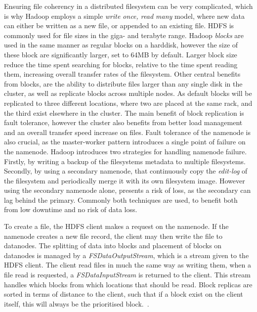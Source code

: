 Ensuring file coherency in a distributed filesystem can be very complicated, which is why Hadoop employs a simple \emph{write once, read many} model, where new data can either be written as a new file, or appended to an existing file. HDFS is commonly used for file sizes in the giga- and terabyte range. Hadoop \emph{blocks} are used in the same manner as regular blocks on a harddisk, however the size of these block are significantly larger, set to 64MB by default. Larger block size reduce the time spent searching for blocks, relative to the time spent reading them, increasing overall transfer rates of the filesystem. Other central benefits from blocks, are the ability to distribute files larger than any single disk in the cluster, as well as replicate blocks across multiple nodes. 
As default blocks will be replicated to three different locations, where two are placed at the same rack, and the third exist elsewhere in the cluster. The main benefit of block replication is fault tolerance, however the cluster also benefits from better load management and an overall transfer speed increase on files. Fault tolerance of the namenode is also crucial, as the master-worker pattern introduces a single point of failure on the namenode. Hadoop introduces two strategies for handling namenode failure. Firstly, by writing a backup of the filesystems metadata to multiple filesystems. Secondly, by using a secondary namenode, that continuously copy the \emph{edit-log} of the filesystem and periodically merge it with its own filesystem image. However using the secondary namenode alone, presents a risk of loss, as the secondary can lag behind the primary. Commonly both techniques are used, to benefit both from low downtime and no risk of data loss.

To create a file, the HDFS client makes a request on the namenode. If the namenode creates a new file record, the client may then write the file to datanodes. The splitting of data into blocks and placement of blocks on datanodes is managed by a \emph{FSDataOutputStream}, which is a stream given to the HDFS client. The client read files in much the same way as writing them, when a file read is requested, a \emph{FSDataInputStream} is returned to the client. This stream handles which blocks from which locations that should be read. Block replicas are sorted in terms of distance to the client, such that if a block exist on the client itself, this will always be the prioritised block.~\cite{hadoopIntro}.

